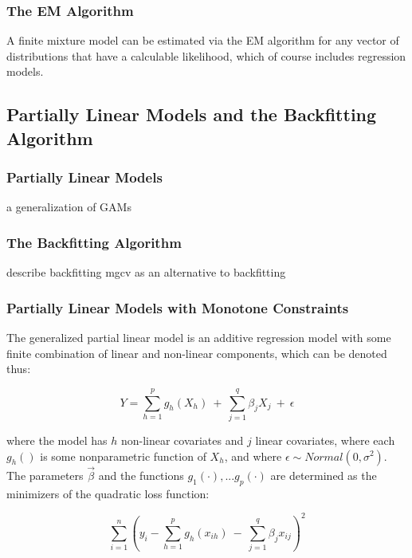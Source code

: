 \documentclass[fleqn,10pt]{olplainarticle}\usepackage[]{graphicx}\usepackage[]{color}
\begin{document}
\subsubsection{The EM Algorithm}

A finite mixture model can be estimated via the EM algorithm for any vector of distributions that have a calculable likelihood, which of course includes regression models.

\subsection{Partially Linear Models and the Backfitting Algorithm}

\subsubsection{Partially Linear Models}

a generalization of GAMs

\subsubsection{The Backfitting Algorithm}

describe backfitting
mgcv as an alternative to backfitting

\subsubsection{Partially Linear Models with Monotone Constraints}

The generalized partial linear model is an additive regression model with some finite combination of linear and non-linear components, which can be denoted thus:


\begin{equation} \label{partlin}
  Y = \sum_{h=1}^{p} g_{h} (X_{h}) \ +\  \sum_{j=1}^{q} \beta_{j} X_{j} \ +\ \epsilon
\end{equation}


where the model has $h$ non-linear covariates and $j$ linear covariates, where each $g_{h}()$ is some nonparametric function of $X_{h}$, and where $\epsilon \sim Normal(0, \sigma^2)$. The parameters $\vec{\beta}$ and the functions $g_1(\cdot),...g_p(\cdot)$ are determined as the minimizers of the quadratic loss function:

\begin{equation} \label{partlinloss}
  \sum_{i=1}^{n} (y_i - \sum_{h=1}^{p} g_{h} (x_{ih}) \ -\  \sum_{j=1}^{q} \beta_{j} x_{ij})^2
\end{equation}
\end{document}
